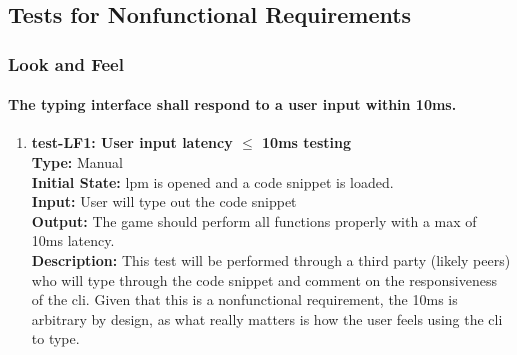 \documentclass[12pt, titlepage]{article}
\begin{document}
\subsection{Tests for Nonfunctional Requirements}

\subsubsection{Look and Feel}

\paragraph{The typing interface shall respond to a user input within 10ms.}
\begin{enumerate}
    \item{\textbf{test-LF1: User input latency $\leq$ 10ms testing}\\}
    \textbf{Type:} Manual\\
    \textbf{Initial State:}  lpm is opened and a code snippet is loaded.\\
    \textbf{Input:} User will type out the code snippet\\
    \textbf{Output:} The game should perform all functions properly with a max of 10ms latency. \\
    \textbf{Description: } This test will be performed through a third party (likely peers) who will type through the code snippet and comment on the responsiveness of the cli. Given that this is a nonfunctional requirement, the 10ms is arbitrary by design, as what really matters is how the user feels using the cli to type.\\
\end{enumerate}
\end{document}
